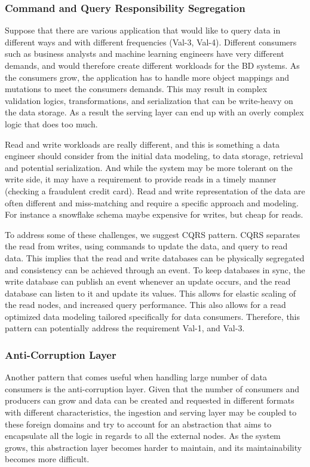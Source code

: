 \documentclass{bmcart}
\begin{document}
\subsubsection{Command and Query Responsibility Segregation}

Suppose that there are various application that would like to query data in different ways and with different frequencies (Val-3, Val-4). Different consumers such as business analysts and machine learning engineers have very different demands, and would therefore create different workloads for the BD systems. As the consumers grow, the application has to handle more object mappings and mutations to meet the consumers demands. This may result in complex validation logics, transformations, and serialization that can be write-heavy on the data storage. As a result the serving layer can end up with an overly complex logic that does too much. 

Read and write workloads are really different, and this is something a data engineer should consider from the initial data modeling, to data storage, retrieval and potential serialization. And while the system may be more tolerant on the write side, it may have a requirement to provide reads in a timely manner (checking a fraudulent credit card). Read and write representation of the data are often different and miss-matching and require a specific approach and modeling. For instance a snowflake schema maybe expensive for writes, but cheap for reads. 

To address some of these challenges, we suggest CQRS pattern. CQRS separates the read from writes, using commands to update the data, and query to read data. This implies that the read and write databases can be physically segregated and consistency can be achieved through an event. To keep databases in sync, the write database can publish an event whenever an update occurs, and the read database can listen to it and update its values. This allows for elastic scaling of the read nodes, and increased query performance. This also allows for a read optimized data modeling tailored specifically for data consumers. Therefore, this pattern can potentially address the requirement Val-1, and Val-3. 

\subsubsection{Anti-Corruption Layer}

Another pattern that comes useful when handling large number of data consumers is the anti-corruption layer. Given that the number of consumers and producers can grow and data can be created and requested in different formats with different characteristics, the ingestion and serving layer may be coupled to these foreign domains and try to account for an abstraction that aims to encapsulate all the logic in regards to all the external nodes. As the system grows, this abstraction layer becomes harder to maintain, and its maintainability becomes more difficult. 
\end{document}

